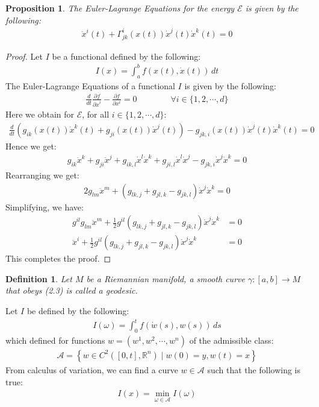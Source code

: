 \documentclass[11pt]{book}
\theoremstyle{break}
\theoremstyle{break}
\newtheorem{prop}[lem]{Proposition}
\newtheorem{defn}{Definition}[corL]
\newcommand{\R}{\mathbb{R}}
\newcommand{\pd}{\partial}
\begin{document}
\begin{prop}
The Euler-Lagrange Equations for the energy $\mathcal{E}$ is given by the following:
\begin{align}
\ddot{x}^i(t) + \Gamma_{jk}^i (x(t)) \dot{x}^j(t) \dot{x}^k (t) = 0
\end{align}
\end{prop}
\begin{proof}
Let $I$ be a functional defined by the following:
\begin{align*}
I(x) = \int_a^b f(x(t), \dot{x}(t)) \, dt
\end{align*}
The Euler-Lagrange Equations of a functional $I$ is given by the following:
\begin{align*}
\frac{d}{dt}\frac{\pd f}{\pd \dot{x}^i} - \frac{\pd f}{\pd x^i} = 0\qquad\qquad \forall i \in \{1,2,\cdots, d\}
\end{align*}
Here we obtain for $\mathcal{E}$, for all $i\in \{1,2,\cdots, d\}$:
\begin{align*}
\frac{d}{dt}\left( g_{ik}(x(t)) \dot{x}^k(t) + g_{ji}(x(t)) \dot{x}^j(t) \right) - g_{jk,i}(x(t)) \dot{x}^j(t) \dot{x}^k(t) = 0
\end{align*}
Hence we get:
\begin{align*}
g_{ik}\ddot{x}^k + g_{ji}\ddot{x}^j + g_{ik,l}\dot{x}^l \dot{x}^k + g_{ji,l}\dot{x}^l \dot{x}^j -g_{jk,i}\dot{x}^j\dot{x}^k = 0
\end{align*}
Rearranging we get:
\begin{align}
2g_{lm}\ddot{x}^m + \left( g_{lk,j}+ g_{jl,k}-g_{jk,l}\right) \dot{x}^j\dot{x}^k = 0 
\end{align}
Simplifying, we have:
\begin{align*}
g^{il}g_{lm}\ddot{x}^m + \frac{1}{2}g^{il}\left( g_{lk,j}+ g_{jl,k}-g_{jk,l}\right) \dot{x}^j\dot{x}^k &= 0 \\
\ddot{x}^i + \frac{1}{2}g^{il}\left( g_{lk,j}+ g_{jl,k}-g_{jk,l}\right) \dot{x}^j\dot{x}^k &= 0
\end{align*}
This completes the proof.
\end{proof}


\begin{defn}
Let $M$ be a Riemannian manifold, a smooth curve $\gamma:[a,b]\to M$ that obeys (2.3) is called a geodesic. 
\end{defn}


Let $I$ be defined by the following:
\begin{align*}
I(\omega) = \int_0^t f(\dot{w}(s), w(s))\, ds
\end{align*}
which defined for functions $w = (w^1,w^2,\cdots, w^n)$ of the admissible class:
\begin{align*}
\mathcal{A} = \left\{ w\in C^2([0,t],\R^n) \mid w(0) = y, w(t) = x\right\}
\end{align*}
From calculus of variation, we can find a curve $w \in \mathcal{A}$ such that the following is true:
\begin{align*}
I(x) = \min_{\omega \in \mathcal{A}} I(\omega)
\end{align*}
\end{document}
